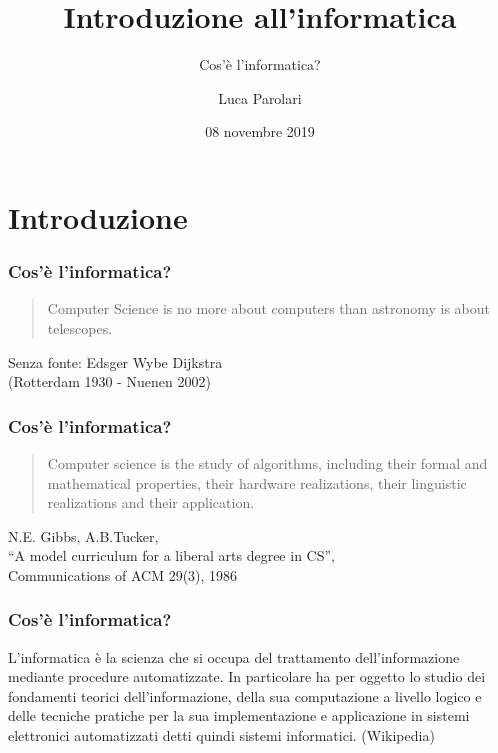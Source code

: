 \documentclass[11pt]{beamer}
\title[Introduzione]{Introduzione all'informatica}
\subtitle{Cos'è l'informatica?}
\author{Luca Parolari}
\date{08 novembre 2019}
\begin{document}
    \begin{frame}[plain]
        \maketitle
    \end{frame}
    
    \section{Introduzione}

    \begin{frame}
        \frametitle{Cos'è l'informatica?}
        
        \blockquote{Computer Science is no more about computers than astronomy is about telescopes.}
        
        \begin{flushright}
            Senza fonte: Edsger Wybe Dijkstra\\
            (Rotterdam 1930 - Nuenen 2002)
        \end{flushright}
    \end{frame}

    \begin{frame}
        \frametitle{Cos'è l'informatica?}
        
        \blockquote{Computer science is the study of algorithms,    including their formal and mathematical properties, their hardware realizations, their linguistic realizations and their application.}
        
        \begin{flushright}
            N.E. Gibbs, A.B.Tucker,\\ ``A model curriculum for a liberal arts degree in CS'',\\ Communications of ACM 29(3), 1986
        \end{flushright}
    
    \end{frame}

    \begin{frame}
        \frametitle{Cos'è l'informatica?}
        
        L'informatica è la scienza che si occupa del trattamento dell'informazione mediante \alert{procedure automatizzate}. In particolare ha per oggetto lo studio dei fondamenti teorici dell'informazione, della sua computazione a livello logico e delle tecniche pratiche per la sua implementazione e applicazione in sistemi elettronici automatizzati detti quindi sistemi informatici. (Wikipedia)
    \end{frame}
\end{document}
